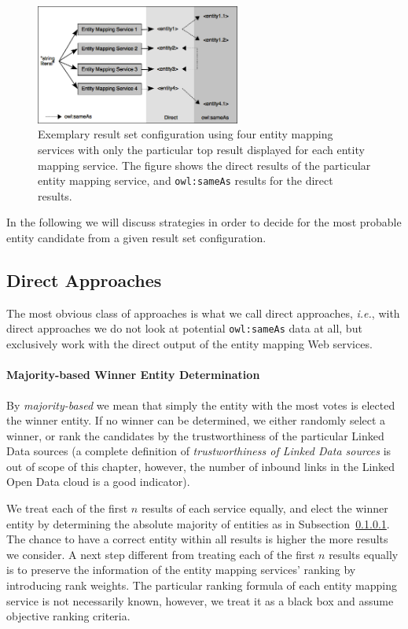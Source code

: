 \begin{figure}
 \centering
 \includegraphics[width=0.6\textwidth]{diagram.png}
 \caption{Exemplary result set configuration using four entity mapping services with only the particular top result displayed for each entity mapping service. The figure shows the direct results of the particular entity mapping service, and \texttt{owl:sameAs} results for the direct results.}
 \label{fig:diagram}
\end{figure}

In the following we will discuss strategies in order to decide for the most probable entity candidate from a given
result set configuration.

\subsection{Direct Approaches}
The most obvious class of approaches is what we call direct approaches, \emph{i.e.}, with direct approaches we do not look at potential \texttt{owl:sameAs} data at all, but exclusively work with the direct output of the entity mapping Web services.

\paragraph{Majority-based Winner Entity Determination}\label{sec:direct}
By \textit{majority-based} we mean that simply the entity with the most votes is elected the winner entity. If no
winner can be determined, we either randomly select a winner, or rank the candidates by the trustworthiness of the
particular Linked Data sources (a complete definition of \textit{trustworthiness of Linked Data sources} is out of
scope of this chapter, however, the number of inbound links in the Linked Open Data
cloud is a good indicator).

We treat each of the first $n$ results of each service equally, and elect the winner entity by determining the
absolute majority of entities as in Subsection~\ref{sec:direct}. The chance to have a correct entity within all results is
higher the more results we consider. A next step different from treating each of the first $n$
results equally is to preserve the information of the entity mapping services' ranking by introducing rank
weights. The particular ranking formula of each entity mapping service is not necessarily known, however, we treat it as a black box and assume objective ranking criteria.

